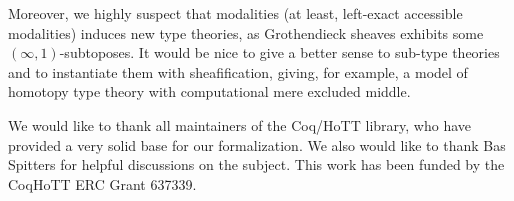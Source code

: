 \documentclass[notfinal]{jfrarticle}
\begin{document}
Moreover, we highly suspect that modalities (at least, left-exact
accessible modalities) induces new type theories, as Grothendieck
sheaves exhibits some $(\infty,1)$-subtoposes. It would be nice to
give a better sense to sub-type theories and to instantiate them with
sheafification, giving, for example, a model of homotopy type theory with
computational mere excluded middle.


\begin{acks}
  

We would like to thank all maintainers of the Coq/HoTT library, who
have provided a very solid base for our formalization. 
%
We also would like to thank Bas Spitters for helpful discussions on
the subject.
%
This work has been funded by the CoqHoTT ERC Grant 637339.
\end{acks}









\end{document}
